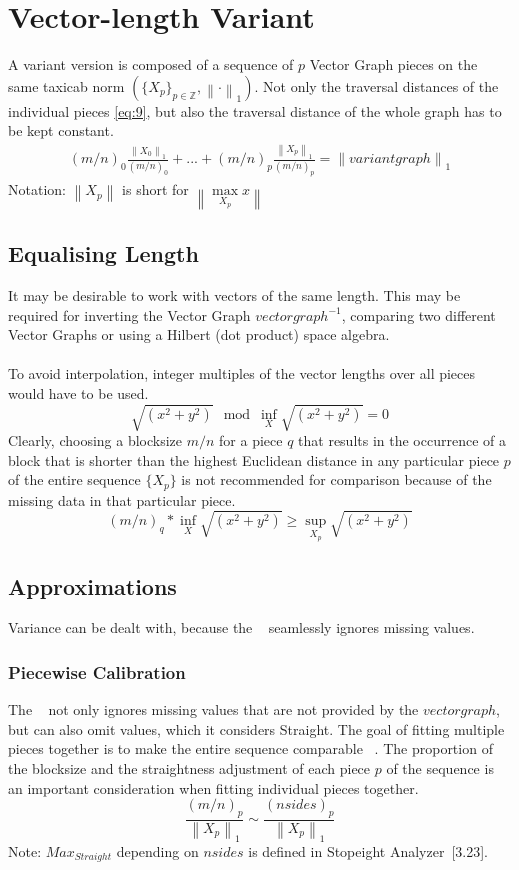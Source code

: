 \documentclass{report}
\newcommand\norm[1]{\left\lVert#1\right\rVert}
\begin{document}
\chapter{Vector-length Variant}
A variant version is composed of a sequence of $p$ Vector Graph pieces on the same taxicab norm $(\{X_{p}\}_{p\in \mathbb{Z}},\norm{\cdot}_1)$. Not only the traversal distances of the individual pieces \eqref{eq:9}, but also the traversal distance of the whole graph has to be kept constant.
\begin{align}
(m/n)_{0}\frac{\norm{X_{0}}_{1}}{(m/n)_{0}}+...+(m/n)_{p}\frac{\norm{X_{p}}_{1}}{(m/n)_{p}}=\norm{variantgraph}_1
\end{align}
Notation: $\norm{X_{p}}$ is short for $\norm{\max \limits _{X_{p}} x}$
\section{Equalising Length}
It may be desirable to work with vectors of the same length. This may be required for inverting the Vector Graph $vectorgraph^{-1}$, comparing two different Vector Graphs or using a Hilbert (dot product) space algebra.\\\\
To avoid interpolation, integer multiples of the vector lengths over all pieces would have to be used.
\begin{equation}
\sqrt{(x^2+y^2)} \mod \inf \limits _{X} \sqrt{(x^2+y^2)} = 0
\end{equation}
Clearly, choosing a blocksize $m/n$ for a piece $q$ that results in the occurrence of a block that is shorter than the highest Euclidean distance in any particular piece $p$ of the entire sequence $\{X_{p}\}$ is not recommended for comparison because of the missing data in that particular piece.
\begin{equation}
(m/n)_{q}*\inf \limits _{X} \sqrt{(x^2+y^2)} \geq \sup \limits _{X_{p}} \sqrt{(x^2+y^2)}\label{eq:4}
\end{equation}
\section{Approximations}
Variance can be dealt with, because the ~\cite[Stopeight\_Analyzer.tex]{Analyzer} seamlessly ignores missing values.
\subsection{Piecewise Calibration}
The ~\cite[Stopeight\_Analyzer.tex]{Analyzer} not only ignores missing values that are not provided by the $vectorgraph$, but can also omit values, which it considers Straight. The goal of fitting multiple pieces together is to make the entire sequence comparable ~\cite[Non-Orthogonal]{Comparator}. The proportion of the blocksize and the straightness adjustment of each piece $p$ of the sequence is an important consideration when fitting individual pieces together.
\begin{equation}
\frac{(m/n)_{p}}{\norm{X_{p}}_{1}} \sim \frac{(nsides)_{p}}{\norm{X_{p}}_{1}}
\end{equation}
Note: $Max_{Straight}$ depending on $nsides$ is defined in Stopeight Analyzer~\cite{Analyzer}[3.23].
\end{document}
